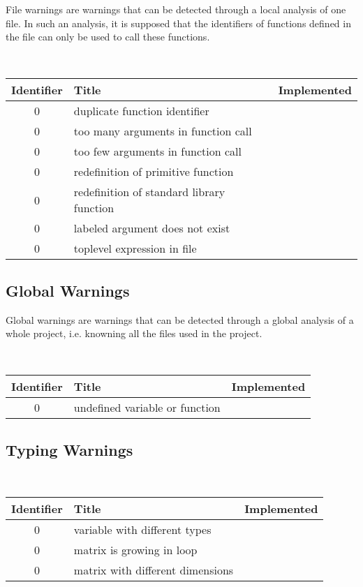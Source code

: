 File warnings are warnings that can be detected through a local
analysis of one file. In such an analysis, it is supposed that the
identifiers of functions defined in the file can only be used to call
these functions.

\noindent\\\begin{tabular}{|c|p{8cm}|c|} \hline
Identifier & Title & Implemented      \\ \hline
  0 & duplicate function identifier &  \\ \hline
  0 & too many arguments in function call &  \\ \hline
  0 & too few arguments in function call  &  \\ \hline
  0 & redefinition of primitive function &  \\ \hline
  0 & redefinition of standard library function &  \\ \hline
  0 & labeled argument does not exist &  \\ \hline
  0 & toplevel expression in file &  \\ \hline
\end{tabular}

\subsection{Global Warnings}

Global warnings are warnings that can be detected through a global
analysis of a whole project, i.e. knowning all the files used in the
project.

\noindent\\\begin{tabular}{|c|p{8cm}|c|} \hline
Identifier & Title & Implemented      \\ \hline
  0 & undefined variable or function &  \\ \hline
\end{tabular}

\subsection{Typing Warnings}



\noindent\\\begin{tabular}{|c|p{8cm}|c|} \hline
Identifier & Title & Implemented      \\ \hline
  0 & variable with different types &  \\ \hline
  0 & matrix is growing in loop &  \\ \hline
  0 & matrix with different dimensions &  \\ \hline
\end{tabular}

